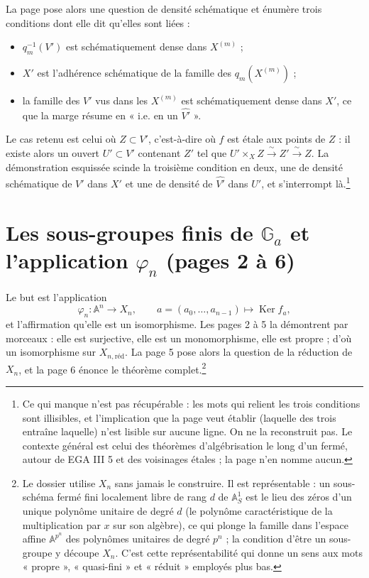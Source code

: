 \documentclass[11pt,a4paper]{article}
\begin{document}
La page pose alors une question de densité schématique et énumère trois
conditions dont elle dit qu'elles sont liées :

\begin{itemize}
\item $q_m^{-1}(V')$ est schématiquement dense dans $X^{(m)}$ ;
\item $X'$ est l'adhérence schématique de la famille des $q_m(X^{(m)})$ ;
\item la famille des $V'$ vus dans les $X^{(m)}$ est schématiquement dense
dans $X'$, ce que la marge résume en « i.e. en un $\hat{V'}$ ».
\end{itemize}

Le cas retenu est celui où $Z \subset V'$, c'est-à-dire où $f$ est étale aux
points de $Z$ : il existe alors un ouvert $U' \subset V'$ contenant $Z'$ tel
que $U' \times_X Z \xrightarrow{\ \sim\ } Z' \xrightarrow{\ \sim\ } Z$. La
démonstration esquissée scinde la troisième condition en deux, une de
densité schématique de $V'$ dans $X'$ et une de densité de $\hat{V'}$ dans
$U'$, et s'interrompt là.\footnote{Ce qui manque n'est pas récupérable :
les mots qui relient les trois conditions sont illisibles, et l'implication
que la page veut établir (laquelle des trois entraîne laquelle) n'est
lisible sur aucune ligne. On ne la reconstruit pas. Le contexte général est
celui des théorèmes d'algébrisation le long d'un fermé, autour de EGA III 5
et des voisinages étales ; la page n'en nomme aucun.}

\section*{Les sous-groupes finis de $\mathbb{G}_a$ et l'application $\varphi_n$ (pages 2 à 6)}

Le but est l'application
\[
  \varphi_n : \mathbb{A}^n \longrightarrow X_n, \qquad
  a = (a_0, \dots, a_{n-1}) \longmapsto \operatorname{Ker} f_a ,
\]
et l'affirmation qu'elle est un isomorphisme. Les pages 2 à 5 la démontrent
par morceaux : elle est surjective, elle est un monomorphisme, elle est
propre ; d'où un isomorphisme sur $X_{n,\mathrm{réd}}$. La page 5 pose alors
la question de la réduction de $X_n$, et la page 6 énonce le théorème
complet.\footnote{Le dossier utilise $X_n$ sans jamais le construire. Il est
représentable : un sous-schéma fermé fini localement libre de rang $d$ de
$\mathbb{A}^1_S$ est le lieu des zéros d'un unique polynôme unitaire de
degré $d$ (le polynôme caractéristique de la multiplication par $x$ sur son
algèbre), ce qui plonge la famille dans l'espace affine $\mathbb{A}^{p^n}$
des polynômes unitaires de degré $p^n$ ; la condition d'être un sous-groupe y
découpe $X_n$. C'est cette représentabilité qui donne un sens aux mots
« propre », « quasi-fini » et « réduit » employés plus bas.}
\end{document}
